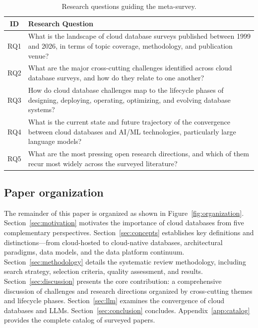 \documentclass[a4paper,fleqn]{cas-sc}
\begin{document}
\begin{table}[H]
\centering
\caption{Research questions guiding the meta-survey.}
\label{tab:rqs}
\small
\begin{tabular}{c p{10cm}}
\toprule
\textbf{ID} & \textbf{Research Question} \\
\midrule
RQ1 & What is the landscape of cloud database surveys published between 1999 and 2026, in terms of topic coverage, methodology, and publication venue? \\
\addlinespace
RQ2 & What are the major cross-cutting challenges identified across cloud database surveys, and how do they relate to one another? \\
\addlinespace
RQ3 & How do cloud database challenges map to the lifecycle phases of designing, deploying, operating, optimizing, and evolving database systems? \\
\addlinespace
RQ4 & What is the current state and future trajectory of the convergence between cloud databases and AI/ML technologies, particularly large language models? \\
\addlinespace
RQ5 & What are the most pressing open research directions, and which of them recur most widely across the surveyed literature? \\
\bottomrule
\end{tabular}
\end{table}

\subsection{Paper organization}
\label{subsec:organization}

The remainder of this paper is organized as shown in Figure~\ref{fig:organization}. Section~\ref{sec:motivation} motivates the importance of cloud databases from five complementary perspectives. Section~\ref{sec:concepts} establishes key definitions and distinctions---from cloud-hosted to cloud-native databases, architectural paradigms, data models, and the data platform continuum. Section~\ref{sec:methodology} details the systematic review methodology, including search strategy, selection criteria, quality assessment, and results. Section~\ref{sec:discussion} presents the core contribution: a comprehensive discussion of challenges and research directions organized by cross-cutting themes and lifecycle phases. Section~\ref{sec:llm} examines the convergence of cloud databases and LLMs. Section~\ref{sec:conclusion} concludes. Appendix~\ref{app:catalog} provides the complete catalog of surveyed papers.
\end{document}
